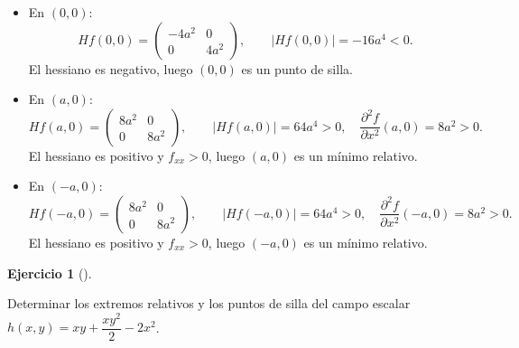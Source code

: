 \documentclass[
  spanish,
  a4paper,
]{scrreport}
\theoremstyle{definition}
\newtheorem{exercise}{Ejercicio}[chapter]
\theoremstyle{remark}
\begin{document}
\begin{tcolorbox}
\begin{itemize}
\item
  En \((0,0)\): \[
  Hf(0,0)=\begin{pmatrix}-4a^2 & 0\\ 0 & 4a^2\end{pmatrix},\qquad
  |Hf(0,0)|=-16a^4<0.
  \] El hessiano es negativo, luego \((0,0)\) es un punto de silla.
\item
  En \((a,0)\): \[
  Hf(a,0)=\begin{pmatrix}8a^2 & 0\\ 0 & 8a^2\end{pmatrix},\qquad
  |Hf(a,0)|=64a^4>0,\quad \frac{\partial^2 f}{\partial x^2}(a,0)=8a^2>0.
  \] El hessiano es positivo y \(f_{xx}>0\), luego \((a,0)\) es un
  mínimo relativo.
\item
  En \((-a,0)\): \[
  Hf(-a,0)=\begin{pmatrix}8a^2 & 0\\ 0 & 8a^2\end{pmatrix},\qquad
  |Hf(-a,0)|=64a^4>0,\quad \frac{\partial^2 f}{\partial x^2}(-a,0)=8a^2>0.
  \] El hessiano es positivo y \(f_{xx}>0\), luego \((-a,0)\) es un
  mínimo relativo.
\end{itemize}

\end{tcolorbox}

\begin{exercise}[]\protect\hypertarget{exr-extremos-2}{}\label{exr-extremos-2}

Determinar los extremos relativos y los puntos de silla del campo
escalar \(h(x,y) = xy+\dfrac{xy^2}{2}-2x^2\).

\end{exercise}
\end{document}
